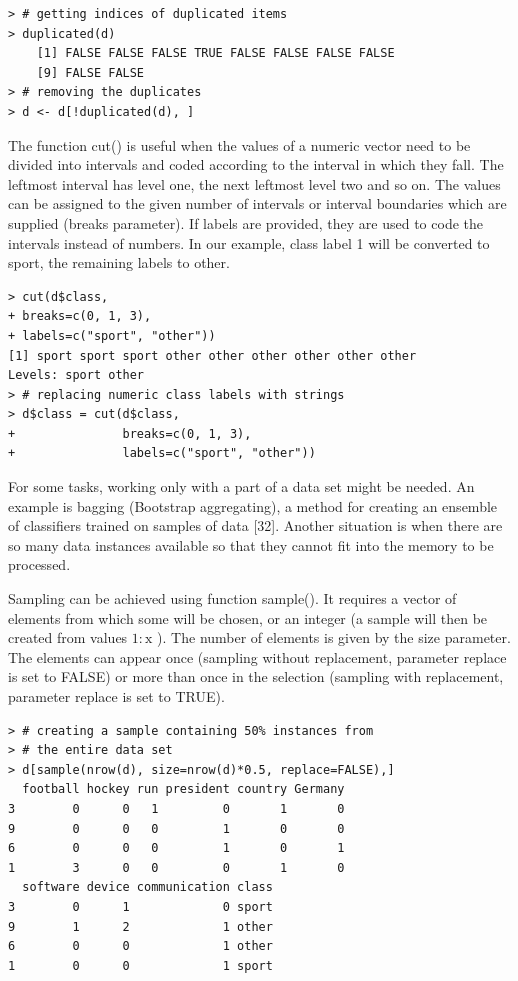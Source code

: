 \documentclass[11pt,openany,executivepaper]{book}
\begin{document}
\begin{verbatim}
> # getting indices of duplicated items
> duplicated(d)
    [1] FALSE FALSE FALSE TRUE FALSE FALSE FALSE FALSE
    [9] FALSE FALSE
> # removing the duplicates
> d <- d[!duplicated(d), ]
\end{verbatim}

The function cut() is useful when the values of a numeric vector need to be divided into intervals and coded according to the interval in which they fall. The leftmost interval has level one, the next leftmost level two and so on. The values can be assigned to the given number of intervals or interval boundaries which are supplied (breaks parameter). If labels are provided, they are used to code the intervals instead of numbers. In our example, class label 1 will be converted to sport, the remaining labels to other.

\begin{verbatim}
> cut(d$class,
+ breaks=c(0, 1, 3),
+ labels=c("sport", "other"))
[1] sport sport sport other other other other other other
Levels: sport other
> # replacing numeric class labels with strings
> d$class = cut(d$class,
+               breaks=c(0, 1, 3),
+               labels=c("sport", "other"))
\end{verbatim}

For some tasks, working only with a part of a data set might be needed. An example is bagging (Bootstrap aggregating), a method for creating an ensemble of classifiers trained on samples of data [32]. Another situation is when there are so many data instances available so that they cannot fit into the memory to be processed.

Sampling can be achieved using function sample(). It requires a vector of elements from which some will be chosen, or an integer (a sample will then be created from values $1: \mathrm{x}$ ). The number of elements is given by the size parameter. The elements can appear once (sampling without replacement, parameter replace is set to FALSE) or more than once in the selection (sampling with replacement, parameter replace is set to TRUE).
\clearpage
\begin{verbatim}
> # creating a sample containing 50% instances from
> # the entire data set
> d[sample(nrow(d), size=nrow(d)*0.5, replace=FALSE),]
  football hockey run president country Germany
3        0      0   1         0       1       0
9        0      0   0         1       0       0
6        0      0   0         1       0       1
1        3      0   0         0       1       0
  software device communication class
3        0      1             0 sport
9        1      2             1 other
6        0      0             1 other
1        0      0             1 sport

\end{verbatim}
\end{document}
